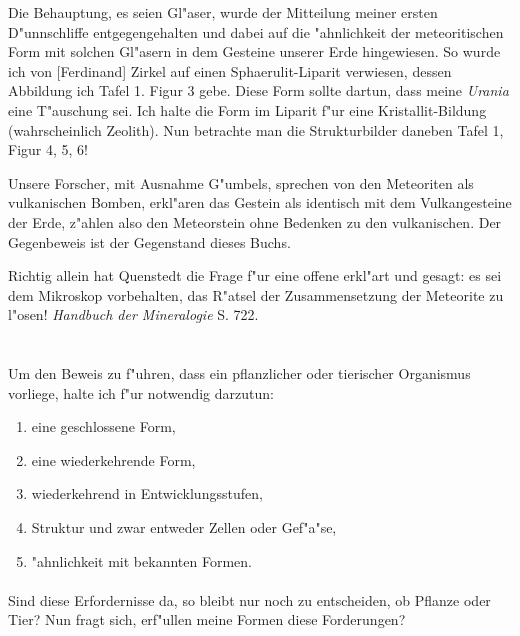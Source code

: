 \documentclass[a4paper, 11pt, oneside]{article}
\begin{document}
Die Behauptung, es seien Gl"aser, wurde der Mitteilung meiner ersten D"unnschliffe entgegengehalten und dabei auf die "ahnlichkeit der meteoritischen Form mit solchen Gl"asern in dem Gesteine unserer Erde hingewiesen. So wurde ich von [Ferdinand] Zirkel auf einen Sphaerulit-Liparit verwiesen, dessen Abbildung ich Tafel 1. Figur 3 gebe. Diese Form sollte dartun, dass meine \emph{Urania} eine T"auschung sei. Ich halte die Form im Liparit f"ur eine Kristallit-Bildung (wahrscheinlich Zeolith). Nun betrachte man die Strukturbilder daneben Tafel 1, Figur 4, 5, 6!

Unsere Forscher, mit Ausnahme G"umbels, sprechen von den Meteoriten als vulkanischen Bomben, erkl"aren das Gestein als identisch mit dem Vulkangesteine der Erde, z"ahlen also den Meteorstein ohne Bedenken zu den vulkanischen. Der Gegenbeweis ist der Gegenstand dieses Buchs.

Richtig allein hat Quenstedt die Frage f"ur eine offene erkl"art und gesagt: es sei dem Mikroskop vorbehalten, das R"atsel der Zusammensetzung der Meteorite zu l"osen! \emph{Handbuch der Mineralogie} S. 722.
\clearpage
\section{}
\subsection{}
\paragraph{}
Um den Beweis zu f"uhren, dass ein pflanzlicher oder tierischer Organismus vorliege, halte ich f"ur notwendig darzutun:
\begin{enumerate}
    \item eine geschlossene Form,
    \item eine wiederkehrende Form,
    \item wiederkehrend in Entwicklungsstufen,
    \item Struktur und zwar entweder Zellen oder Gef"a"se,
    \item "ahnlichkeit mit bekannten Formen.
\end{enumerate}
\paragraph{}
Sind diese Erfordernisse da, so bleibt nur noch zu entscheiden, ob Pflanze oder Tier? Nun fragt sich, erf"ullen meine Formen diese Forderungen?
\end{document}
